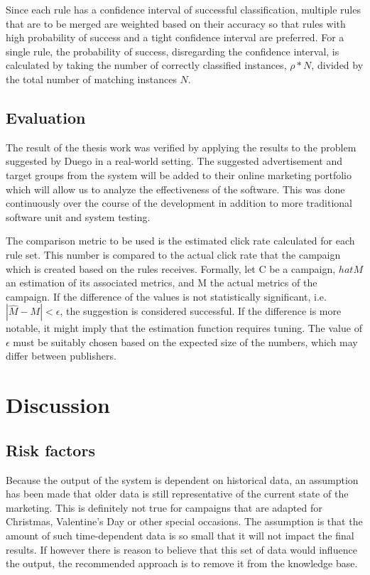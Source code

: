 \documentclass[10pt,twocolumn]{article}
\begin{document}
Since each rule has a confidence interval of successful classification, multiple rules that are to be merged are weighted based on their accuracy so that rules with high probability of success and a tight confidence interval are preferred. For a single rule, the probability of success, disregarding the confidence interval, is calculated by taking the number of correctly classified instances, \(\rho*N\), divided by the total number of matching instances \(N\).

\subsection{Evaluation}
The result of the thesis work was verified by applying the results to the problem suggested by Duego in a real-world setting. The suggested advertisement and target groups from the system will be added to their online marketing portfolio which will allow us to analyze the effectiveness of the software. This was done continuously over the course of the development in addition to more traditional software unit and system testing.

The comparison metric to be used is the estimated click rate calculated for each rule set. This number is compared to the actual click rate that the campaign which is created based on the rules receives. Formally, let C be a campaign, \(hat{M}\) an estimation of its associated metrics, and M the actual metrics of the campaign. If the difference of the values is not statistically significant, i.e. \(|\hat{M} - M| < \epsilon\), the suggestion is considered successful. If the difference is more notable, it might imply that the estimation function requires tuning. The value of \(\epsilon\) must be suitably chosen based on the expected size of the numbers, which may differ between publishers.

\section{Discussion}
\subsection{Risk factors}
Because the output of the system is dependent on historical data, an assumption has been made that older data is still representative of the current state of the marketing. This is definitely not true for campaigns that are adapted for Christmas, Valentine's Day or other special occasions. The assumption is that the amount of such time-dependent data is so small that it will not impact the final results. If however there is reason to believe that this set of data would influence the output, the recommended approach is to remove it from the knowledge base.
\end{document}
